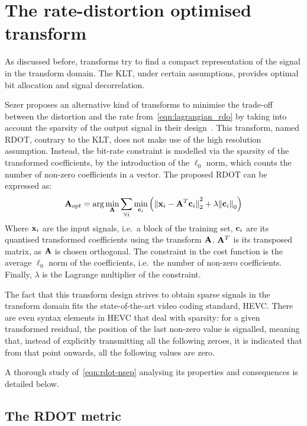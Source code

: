 \documentclass[11pt,a4paper,openright,twoside]{book}
\numberwithin{equation}{section} %
\numberwithin{figure}{section} %
\numberwithin{table}{section} %
\begin{document}
\section{The rate-distortion optimised transform}
\label{sec:the_rate_distortion_optimised_transform}

As discussed before, transforms try to find a compact representation of the
signal in the transform domain.
The \ac{KLT}, under certain assumptions, provides optimal bit allocation and
signal decorrelation.

Sezer proposes an alternative kind of transforms to minimise the trade-off
between the distortion and the rate from~\eqref{eqn:lagrangian_rdo} by taking
into account the sparsity of the output signal in their
design~\cite{sezer-11-phd,sezer-08-sparse-orthonormal-transforms}.
This transform, named \ac{RDOT}, contrary to the \ac{KLT}, does not make use
of the high resolution assumption.
Instead, the bit-rate constraint is modelled via the sparsity of the
transformed coefficients, by the introduction of the $\ell_0$ norm, which
counts the number of non-zero coefficients in a vector.
The proposed \ac{RDOT} can be expressed as:
\begin{equation}
	\mathbf{A}_{opt} = \text{arg}\min\limits_{\mathbf{A}}
	\sum_{\forall i} \min\limits_{\mathbf{c}_i}
	\left(
	{\Vert \mathbf{x}_i - \mathbf{A}^T\mathbf{c}_i \Vert}_2^2 + \lambda{\Vert \mathbf{c}_i \Vert}_0
	\right)
	\label{eqn:rdot-nsep}
\end{equation}
Where $\mathbf{x}_i$ are the input signals, i.e.\ a block of the training set,
$\mathbf{c}_i$ are its quantised transformed coefficients using the transform
$\mathbf{A}$.
$\mathbf{A}^T$ is its transposed matrix, as $\mathbf{A}$ is chosen orthogonal.
The constraint in the cost function is the average $\ell_0$ norm of the
coefficients, i.e.\ the number of non-zero coefficients.
Finally, $\lambda$ is the Lagrange multiplier of the constraint.

The fact that this transform design strives to obtain sparse signals in the
transform domain fits the state-of-the-art video coding standard, \ac{HEVC}.
There are even syntax elements in \ac{HEVC} that deal with sparsity:
for a given transformed residual, the position of the last non-zero value is
signalled, meaning that, instead of explicitly transmitting all the following
zeroes, it is indicated that from that point onwards, all the following values
are zero.

A thorough study of~\eqref{eqn:rdot-nsep} analysing its properties and
consequences is detailed below.

\subsection{The \acs{RDOT} metric}
\label{sub:the_rdot_metric}
\end{document}
